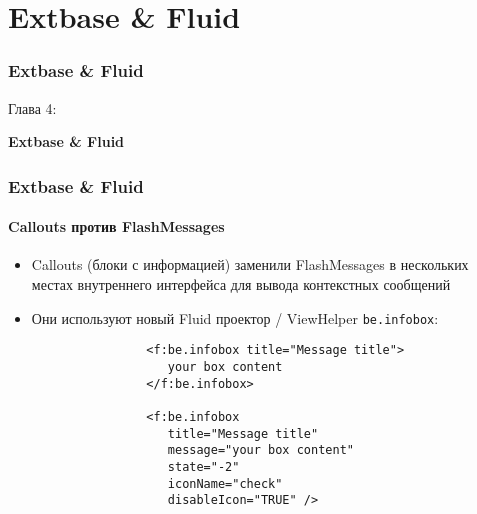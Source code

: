 %

\section{Extbase \& Fluid}
\begin{frame}[fragile]
	\frametitle{Extbase \& Fluid}

	\begin{center}\huge{Глава 4:}\end{center}
	\begin{center}\huge{\color{typo3darkgrey}\textbf{Extbase \& Fluid}}\end{center}

\end{frame}


\begin{frame}[fragile]
	\frametitle{Extbase \& Fluid}
	\framesubtitle{Callouts против FlashMessages}

	\begin{itemize}

		\item Callouts (блоки с информацией) заменили FlashMessages в нескольких местах
			внутреннего интерфейса для вывода контекстных сообщений

		\item Они используют новый Fluid проектор / ViewHelper \texttt{be.infobox}:

			\begin{lstlisting}
				<f:be.infobox title="Message title">
				   your box content
				</f:be.infobox>

				<f:be.infobox
				   title="Message title"
				   message="your box content"
				   state="-2"
				   iconName="check"
				   disableIcon="TRUE" />
			\end{lstlisting}

	\end{itemize}

\end{frame}

